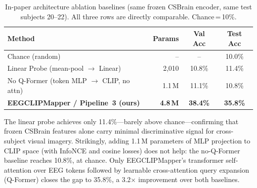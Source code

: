 \documentclass{article}
\begin{document}
\begin{table}[h]
  \centering
  \caption{In-paper architecture ablation baselines (same frozen CSBrain encoder, same test subjects 20--22). All three rows are directly comparable. Chance\,=\,10\%.}
  \label{tab:ablation}
  \small
  \setlength{\tabcolsep}{5pt}
  \begin{tabular}{lrcc}
    \toprule
    \textbf{Method} & \textbf{Params} & \textbf{Val Acc} & \textbf{Test Acc} \\
    \midrule
    Chance (random)                             & --       & --      & 10.0\% \\
    Linear Probe (mean-pool $\to$ Linear)       & 2{,}010  & 10.8\%  & 11.4\% \\
    No Q-Former (token MLP $\to$ CLIP, no attn) & 1.1\,M   & 11.1\%  & 10.8\% \\
    \textbf{EEGCLIPMapper / Pipeline~3 (ours)}  & \textbf{4.8\,M} & \textbf{38.4\%} & \textbf{35.8\%} \\
    \bottomrule
  \end{tabular}
\end{table}

The linear probe achieves only 11.4\%---barely above chance---confirming that frozen CSBrain features alone carry minimal discriminative signal for cross-subject visual imagery. Strikingly, adding 1.1\,M parameters of MLP projection to CLIP space (with InfoNCE and cosine losses) does not help: the no-Q-Former baseline reaches 10.8\%, at chance. Only EEGCLIPMapper's transformer self-attention over EEG tokens followed by learnable cross-attention query expansion (Q-Former) closes the gap to 35.8\%, a 3.2$\times$ improvement over both baselines.
\end{document}
